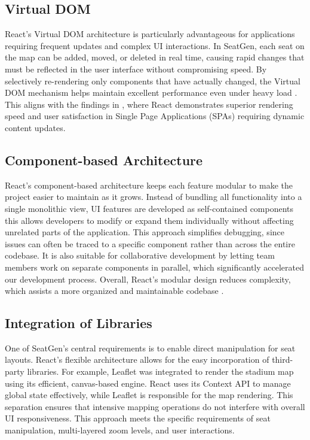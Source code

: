 \subsection{Virtual DOM}
React’s Virtual DOM architecture is particularly advantageous for applications requiring frequent updates and complex UI interactions. In SeatGen, each seat on the map can be added, moved, or deleted in real time, causing rapid changes that must be reflected in the user interface without compromising speed. By selectively re-rendering only components that have actually changed, the Virtual DOM mechanism helps maintain excellent performance even under heavy load \cite{ReactVirtualDOM}. This aligns with the findings in \cite{SPAComp}, where React demonstrates superior rendering speed and user satisfaction in Single Page Applications (SPAs) requiring dynamic content updates.

\subsection{Component-based Architecture}
React’s component-based architecture keeps each feature modular to make the project easier to maintain as it grows. Instead of bundling all functionality into a single monolithic view, UI features are developed as self-contained components this allows developers to modify or expand them individually without affecting unrelated parts of the application. This approach simplifies debugging, since issues can often be traced to a specific component rather than across the entire codebase. It is also suitable for collaborative development by letting team members work on separate components in parallel, which significantly accelerated our development process. Overall, React’s modular design reduces complexity, which assists a more organized and maintainable codebase \cite{ReactCBA01, ReactCBA02, ReactCBA03}.

\subsection{Integration of Libraries}
One of SeatGen’s central requirements is to enable direct manipulation for seat layouts. React’s flexible architecture allows for the easy incorporation of third-party libraries. For example, Leaflet was integrated to render the stadium map using its efficient, canvas-based engine. React uses its Context API to manage global state effectively, while Leaflet is responsible for the map rendering. This separation ensures that intensive mapping operations do not interfere with overall UI responsiveness. This approach meets the specific requirements of seat manipulation, multi-layered zoom levels, and user interactions.

